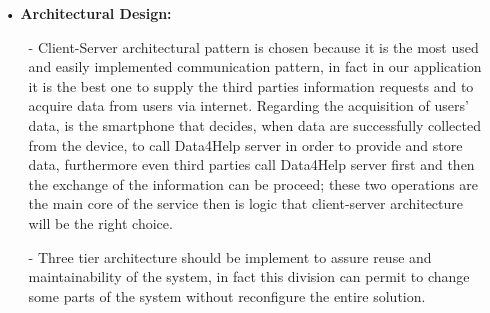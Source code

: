 \begin{enumerate}
\item[•] \textbf{Architectural Design: }\\

	\begin{enumerate}
	\item[-] Client-Server architectural pattern is chosen because it is the most used and easily implemented communication pattern, in fact in our application it is the best one to supply the third parties information requests and to acquire data from users via internet. 
Regarding the acquisition of users' data, is the smartphone that decides, when data are successfully collected from the device, to call Data4Help server in order to provide and store data, furthermore even third parties call Data4Help server first and then the exchange of the information can be proceed; these two operations are the main core of the service then is logic that client-server architecture will be the right choice. 

	\item[-]Three tier architecture should be implement to assure reuse and maintainability of the system, in fact this division can permit to change some parts of the system without reconfigure the entire solution.
	

\end{enumerate}
\end{enumerate}
